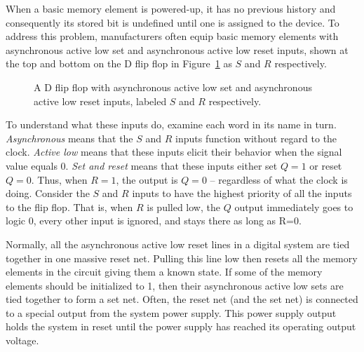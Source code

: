 When a basic memory element is powered-up, it has no previous history
and consequently its stored bit is undefined until one is assigned to
the device.  To address this problem, manufacturers often equip
basic memory elements with 
asynchronous active low set and
asynchronous active low reset inputs, shown at the top
and bottom on the D flip flop in Figure~\ref{fig:sequentialCirDFFSR}
as $S$ and $R$ respectively.

\begin{figure}[ht]
\caption{A D flip flop with asynchronous active low set and asynchronous
active low reset inputs, labeled $S$ and $R$ respectively.}
\label{fig:sequentialCirDFFSR}
\end{figure}

To understand what these inputs do, examine each word in its
name in turn.  \textit{ Asynchronous} means that the $S$ and $R$ inputs
function without regard to the clock.  \textit{ Active low} means that these
inputs elicit their behavior when the signal value equals 0.  \textit{ Set
and reset} means that these inputs either set $Q=1$ or reset $Q=0$.
Thus, when $R=1$, the output is $Q=0$ -- regardless of what the clock is doing.
Consider the $S$ and $R$ inputs to have the highest priority
of all the inputs to the flip flop.  That is, when $R$ is pulled
low, the $Q$ output immediately goes to logic 0, every other input
is ignored, and stays there as long as R=0.

Normally, all the asynchronous active low reset lines in a digital
system are tied together in one massive reset net.  Pulling this
line low then resets all the memory elements in the circuit giving
them a known state.  If some of the memory elements should be
initialized to 1, then their asynchronous active low sets are tied
together to form a set net.  Often, the reset net (and the set net)
is connected to a special output from the system power supply.  This
power supply output holds the system in reset until the power
supply has reached its operating output voltage.
